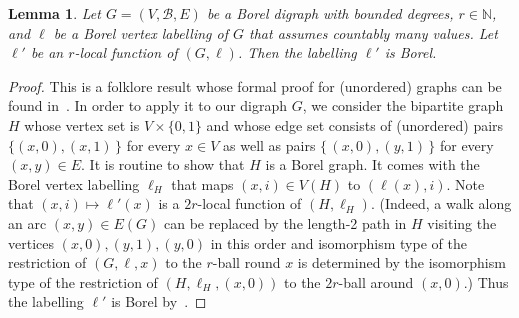 \documentclass[12pt,a4paper]{article}
\numberwithin{equation}{section}
\newtheorem{lemma}[equation]{Lemma}
\theoremstyle{definition}
\newcommand{\si}{{\sigma}}
\newcommand{\Si}{{\Sigma}}
\newcommand\NN{\mathbb N}
\newcommand\I{\operatorname{I}}
\begin{document}
    \begin{lemma}\label{lm:5.7} Let $G=(V,\mathcal B,E)$ be a Borel digraph with bounded degrees,  $r\in\NN$, and $\ell$ be a Borel vertex labelling of $G$ that assumes countably many values. Let $\ell'$ be an $r$-local function of $(G,\ell)$. Then the labelling $\ell'$ is Borel.
    \end{lemma}
    \begin{proof} This is a folklore result whose formal proof for (unordered) graphs can be found in~\cite[Lemma 5.17]{Pikhurko21bcc}. In order to apply it to our digraph $G$, we consider
    the bipartite graph $H$ whose vertex set is $V\times \{0,1\}$  and whose edge set consists of (unordered) pairs $\{(x,0),(x,1)\,\}$ for every $x\in V$  as well as pairs $\{\, (x,0),(y,1)\,\}$ for every $(x,y)\in E$. It is routine to show that $H$ is a Borel graph. It comes with the Borel vertex labelling $\ell_H$ that maps $(x,i)\in V(H)$ to $(\ell(x), i)$.  Note that $(x,i)\mapsto \ell'(x)$ is a $2r$-local function of $(H,\ell_H)$. (Indeed, a walk along an arc $(x,y)\in E(G)$ can be replaced by the length-2 path in $H$ visiting the vertices $(x,0),(y,1),(y,0)$ in this order and isomorphism type of the restriction of $(G,\ell,x)$ to the $r$-ball round $x$ is determined by the isomorphism type of the restriction of $(H,\ell_H,(x,0))$ to the $2r$-ball around $(x,0)$.)
    Thus the labelling $\ell'$ is Borel 
    by~\cite[Lemma 5.17]{Pikhurko21bcc}.
    \end{proof}
    
    
    
\end{document}
